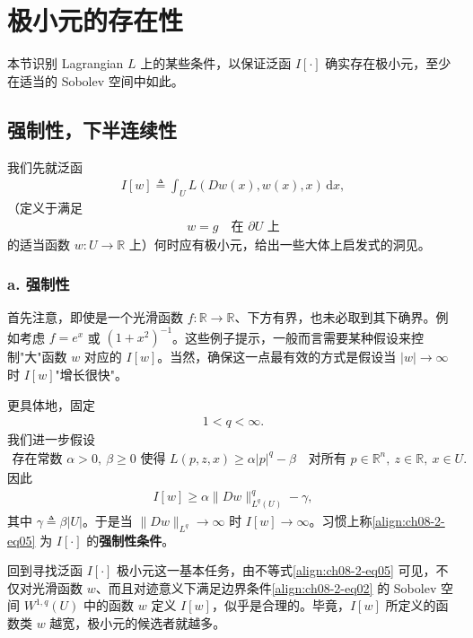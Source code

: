 \documentclass[../../main.tex]{subfiles}
\begin{document}
\section{极小元的存在性}\label{section:ch08-2-极小元的存在性}

本节识别 Lagrangian $L$ 上的某些条件，以保证泛函 $I[\cdot]$ 确实存在极小元，至少在适当的 Sobolev 空间中如此。

\subsection{强制性，下半连续性}\label{subsection:ch08-2-1-强制性下半连续}

我们先就泛函
\begin{align}
I[w]\triangleq\int_U L(Dw(x),w(x),x)\,\mathrm{d}x,\label{align:ch08-2-eq01}
\end{align}
（定义于满足
\begin{align}
w=g\quad\text{在 }\partial U\text{ 上}\label{align:ch08-2-eq02}
\end{align}
的适当函数 $w:U\to\mathbb{R}$ 上）何时应有极小元，给出一些大体上启发式的洞见。

\subsubsection*{a. 强制性}

首先注意，即使是一个光滑函数 $f:\mathbb{R}\to\mathbb{R}$、下方有界，也未必取到其下确界。例如考虑 $f=e^x$ 或 $(1+x^2)^{-1}$。这些例子提示，一般而言需要某种假设来控制"大"函数 $w$ 对应的 $I[w]$。当然，确保这一点最有效的方式是假设当 $|w|\to\infty$ 时 $I[w]$"增长很快"。

更具体地，固定
\begin{align}
1<q<\infty.\label{align:ch08-2-eq03}
\end{align}
我们进一步假设
\begin{align}
\text{存在常数 }\alpha>0,\ \beta\geqslant 0\text{ 使得 }L(p,z,x)\geqslant\alpha|p|^q-\beta\quad\text{对所有 }p\in\mathbb{R}^n,\ z\in\mathbb{R},\ x\in U.\label{align:ch08-2-eq04}
\end{align}
因此
\begin{align}
I[w]\geqslant\alpha\|Dw\|_{L^q(U)}^q-\gamma,\label{align:ch08-2-eq05}
\end{align}
其中 $\gamma\triangleq\beta|U|$。于是当 $\|Dw\|_{L^q}\to\infty$ 时 $I[w]\to\infty$。习惯上称\eqref{align:ch08-2-eq05} 为 $I[\cdot]$ 的\textbf{强制性条件}。

回到寻找泛函 $I[\cdot]$ 极小元这一基本任务，由不等式\eqref{align:ch08-2-eq05} 可见，不仅对光滑函数 $w$、而且对迹意义下满足边界条件\eqref{align:ch08-2-eq02} 的 Sobolev 空间 $W^{1,q}(U)$ 中的函数 $w$ 定义 $I[w]$，似乎是合理的。毕竟，$I[w]$ 所定义的函数类 $w$ 越宽，极小元的候选者就越多。
\end{document}
